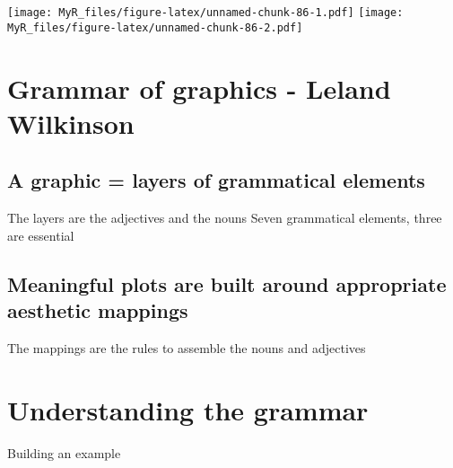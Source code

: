 \documentclass[]{book}
\theoremstyle{definition}
\theoremstyle{definition}
\theoremstyle{definition}
\theoremstyle{remark}
\begin{document}
\texttt{[image: MyR\_files/figure-latex/unnamed-chunk-86-1.pdf]}
\texttt{[image: MyR\_files/figure-latex/unnamed-chunk-86-2.pdf]}

\hypertarget{grammar-of-graphics---leland-wilkinson}{%
\section{Grammar of graphics - Leland
Wilkinson}\label{grammar-of-graphics---leland-wilkinson}}

\hypertarget{a-graphic-layers-of-grammatical-elements}{%
\subsection{A graphic = layers of grammatical
elements}\label{a-graphic-layers-of-grammatical-elements}}

The layers are the adjectives and the nouns Seven grammatical elements,
three are essential

\hypertarget{meaningful-plots-are-built-around-appropriate-aesthetic-mappings}{%
\subsection{Meaningful plots are built around appropriate aesthetic
mappings}\label{meaningful-plots-are-built-around-appropriate-aesthetic-mappings}}

The mappings are the rules to assemble the nouns and adjectives

\hypertarget{understanding-the-grammar}{%
\section{Understanding the grammar}\label{understanding-the-grammar}}

Building an example
\end{document}
